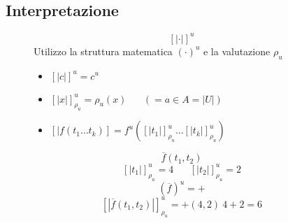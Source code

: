 \documentclass{article}
\theoremstyle{break}
\theoremstyle{break}
\theoremstyle{break}
\theoremstyle{break}
\begin{document}
\subsection{Interpretazione}
\begin{figure}[H]
  \begin{definition}
    \[
      [| \cdot |]^u
    \] 
    Utilizzo la struttura matematica \( ( \cdot )^u \) e la valutazione \( \rho_u \)
    \begin{itemize}
      \item \( [|c|]^u = c^u \) 
      \item \( [|x|]^u_{\rho_u} = \rho_u(x)\;\;\;\;\;\;(=a \in A = |U|) \) 
      \item \( [|f(t_1 \ldots t_k)] = f^u([|t_1|]^u_{\rho_u} \ldots [|t_k|]^u_{\rho_u}) \) 
    \end{itemize}
  \end{definition}
\end{figure}
\begin{figure}[H]
  \begin{example}
    \[
      \overline{f}(t_1,t_2)
    \] 
    \[
      [|t_1|]^u_{\rho_u} = 4 \;\;\;\;\;\; [|t_2|]^u_{\rho_u} = 2
    \] 
    \[
      (\overline{f})^u = +
    \] 
    \[
      [|\overline{f}(t_1,t_2)|]^u_{\rho_u} =  +(4,2) ~ 4+2 = 6 
    \] 
  \end{example}
\end{figure}
\end{document}
